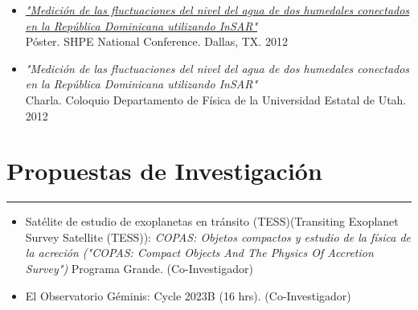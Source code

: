 \documentclass[letterpaper,10pt]{article}
\begin{document}
\begin{itemize}[label=$\blacktriangleright$]
\item \textit{\href{http://manuelpm.me/papers/P\'osterinsar.pdf}{"Medici\'on de las fluctuaciones del nivel del agua de dos humedales conectados en la Rep\'ublica Dominicana utilizando InSAR"}} \\P\'oster. SHPE National Conference. Dallas, TX. 2012

\item \emph{"Medici\'on de las fluctuaciones del nivel del agua de dos humedales conectados en la Rep\'ublica Dominicana utilizando InSAR"}\\
Charla. Coloquio Departamento de Física de la Universidad Estatal de Utah. 2012
\end{itemize}
\begin{comment}
\subsection*{Media Coverage}

\begin{itemize}[label=$\blacktriangleright$]

\item \hyperref[https://phys.org/news/2017-03-planetary-earth-sun.html]{Planetary waves, first found on Earth, are discovered on Sun (phys.org)}

\end{itemize}
\end{comment}
\section*{Propuestas de Investigaci\'on}       

\hrule
\vspace{.3 cm}


\begin{itemize}[label=$\blacktriangleright$]
      \item   Sat\'elite de estudio de exoplanetas en tr\'ansito (TESS)(Transiting Exoplanet Survey Satellite (TESS)): \emph{COPAS: Objetos compactos y estudio de la f\'isica de la acreci\'on ("COPAS: Compact Objects And The Physics Of Accretion Survey")} Programa Grande. (Co-Investigador)
  \end{itemize}

\begin{itemize}[label=$\blacktriangleright$]
      \item   El Observatorio G\'eminis:  Cycle 2023B (16 hrs). (Co-Investigador)
  \end{itemize}
\end{document}
